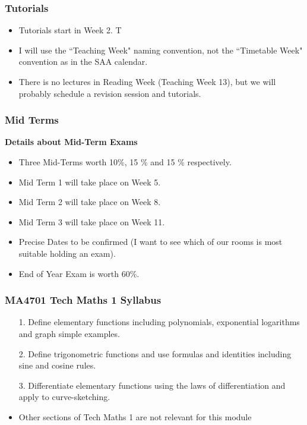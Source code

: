 \documentclass{beamer}
\begin{document}
\begin{frame}
\frametitle{Tutorials}

\begin{itemize}
\item Tutorials start in Week 2. T

\item I will use the ``Teaching Week" naming convention, not the ``Timetable Week" convention as in the SAA calendar. 

\item There is no lectures in Reading Week (Teaching Week 13), but we will probably schedule a revision session and tutorials.

\end{itemize}
\end{frame}

\begin{frame}
	\frametitle{ Mid Terms }
	\textbf{Details about Mid-Term Exams}
	\begin{itemize}
		\item Three Mid-Terms worth 10\%, 15 \% and 15 \% respectively.
		\item Mid Term 1 will take place on Week 5.
		\item Mid Term 2 will take place on Week 8.
		\item Mid Term 3 will take place on Week 11.
		\item Precise Dates to be confirmed (I want to see which of our rooms is most suitable holding an exam).
		\item End of Year Exam is worth 60\%. 
	\end{itemize}
\end{frame}


\begin{frame}
	\frametitle{MA4701 Tech Maths 1 Syllabus}


\begin{itemize}

\item[1.] Define elementary functions including polynomials, exponential logarithms and graph simple examples. 

\item[2.] Define trigonometric functions and use formulas and identities including sine and cosine rules. 

\item[3.] Differentiate elementary functions using the laws of differentiation and apply to curve-sketching. 

\item Other sections of Tech Maths 1 are not relevant for this module
\end{itemize}
\end{frame}
\end{document}
